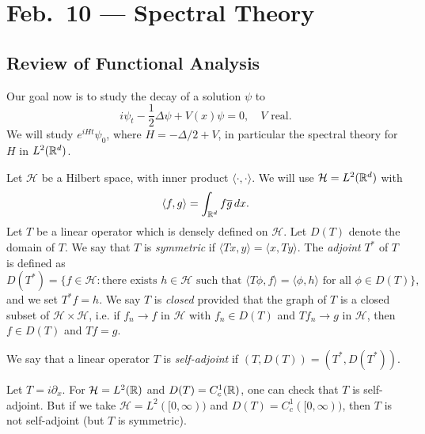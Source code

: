 \chapter{Feb.~10 --- Spectral Theory}

\section{Review of Functional Analysis}

\begin{remark}
  Our goal now is to study the decay of a solution $\psi$ to
  \[
    i\psi_t - \frac{1}{2} \Delta \psi + V(x) \psi = 0, \quad \text{$V$ real}.
  \]
  We will study $e^{iHt} \psi_0$, where
  $H = -\Delta / 2 + V$, in particular the
  spectral theory for $H$ in $L^2(\mathbb{R}^d)$.
\end{remark}

\begin{definition}
  Let $\mathcal{H}$ be a Hilbert space, with inner product
  $\langle \cdot, \cdot \rangle$. We will
  use $\mathcal{H} = L^2(\mathbb{R}^d)$ with
  \[
    \langle f, g \rangle
    = \int_{\mathbb{R}^d} f \overline{g}\, dx.
  \]
  Let $T$ be a linear operator which is densely defined
  on $\mathcal{H}$.
  Let $D(T)$ denote the domain of $T$. We say that
  $T$ is \emph{symmetric} if
  $\langle Tx, y \rangle = \langle x, Ty \rangle$.
  The \emph{adjoint} $T^*$ of $T$ is defined as
  \[
    D(T^*) =
    \{
      f \in \mathcal{H} : \text{there exists $h \in \mathcal{H}$ such that } \langle T \phi, f \rangle = \langle \phi, h \rangle \text{ for all $\phi \in D(T)$}
    \},
  \]
  and we set $T^* f = h$. We say
  $T$ is \emph{closed} provided that the graph
  of $T$ is a closed subset of $\mathcal{H} \times \mathcal{H}$,
  i.e. if $f_n \to f$ in $\mathcal{H}$ with $f_n \in D(T)$
  and $Tf_n \to g$ in $\mathcal{H}$, then
  $f \in D(T)$ and $Tf = g$.
\end{definition}

\begin{definition}
  We say that a linear operator $T$ is \emph{self-adjoint} if
  $(T, D(T)) = (T^*, D(T^*))$.
\end{definition}

\begin{example}
  Let $T = i \partial_x$. For $\mathcal{H} = L^2(\mathbb{R})$ and
  $D(T) = C^1_c(\mathbb{R})$, one can check that $T$ is self-adjoint.
  But if we take $\mathcal{H} = L^2([0, \infty))$ and
  $D(T) = C^1_c([0, \infty))$, then $T$ is not self-adjoint
  (but $T$ is symmetric).
\end{example}

